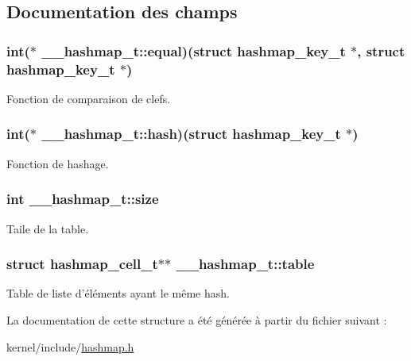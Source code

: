 \subsection{Documentation des champs}
\hypertarget{struct____hashmap__t_a2b730301a68342f67a406ce1b6c2a826}{
\subsubsection[{equal}]{\setlength{\rightskip}{0pt plus 5cm}int($\ast$ \+\_\+\+\_\+hashmap\+\_\+t\+::equal)(struct hashmap\+\_\+key\+\_\+t $\ast$, struct hashmap\+\_\+key\+\_\+t $\ast$)}}\label{struct____hashmap__t_a2b730301a68342f67a406ce1b6c2a826}
Fonction de comparaison de clefs. \hypertarget{struct____hashmap__t_aa56e33c3baa182a530a4a8bfc27c11f1}{
\subsubsection[{hash}]{\setlength{\rightskip}{0pt plus 5cm}int($\ast$ \+\_\+\+\_\+hashmap\+\_\+t\+::hash)(struct hashmap\+\_\+key\+\_\+t $\ast$)}}\label{struct____hashmap__t_aa56e33c3baa182a530a4a8bfc27c11f1}
Fonction de hashage. \hypertarget{struct____hashmap__t_ab5f1e74c3fcf71ee4ac91a860cbcde19}{
\subsubsection[{size}]{\setlength{\rightskip}{0pt plus 5cm}int \+\_\+\+\_\+hashmap\+\_\+t\+::size}}\label{struct____hashmap__t_ab5f1e74c3fcf71ee4ac91a860cbcde19}
Taile de la table. \hypertarget{struct____hashmap__t_ac7d3b722978b8bafab2ce2a923b747aa}{
\subsubsection[{table}]{\setlength{\rightskip}{0pt plus 5cm}struct {\bf hashmap\+\_\+cell\+\_\+t}$\ast$$\ast$ \+\_\+\+\_\+hashmap\+\_\+t\+::table}}\label{struct____hashmap__t_ac7d3b722978b8bafab2ce2a923b747aa}
Table de liste d'éléments ayant le même hash. 

La documentation de cette structure a été générée à partir du fichier suivant \+:\begin{DoxyCompactItemize}
\item 
kernel/include/\hyperlink{hashmap_8h}{hashmap.\+h}\end{DoxyCompactItemize}
